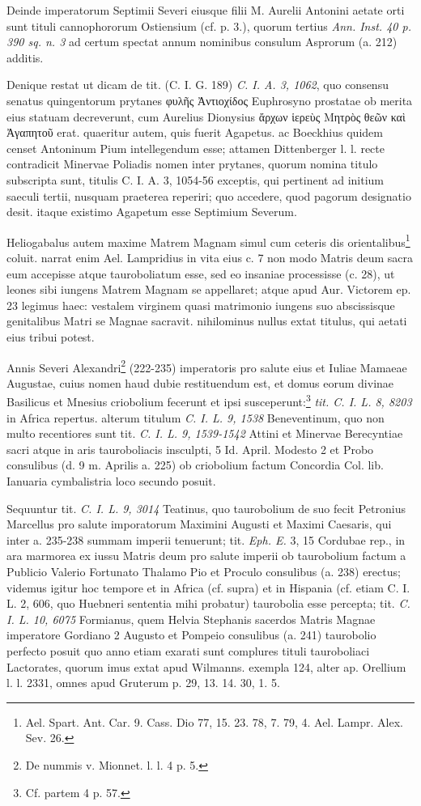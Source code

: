 \documentclass[a4paper, 11pt, oneside, polutonikogreek, german]{article}
\begin{document}
Deinde imperatorum Septimii Severi eiusque filii M. Aurelii Antonini aetate orti sunt tituli cannophororum Ostiensium (cf. p. 3.), quorum tertius \emph{Ann. Inst. 40 p. 390 sq. n. 3} ad certum spectat annum nominibus consulum Asprorum (a. 212) additis.

Denique restat ut dicam de tit. (C. I. G. 189) \emph{C. I. A. 3, 1062}, quo consensu senatus quingentorum prytanes φυλῆς Ἀντιοχίδος Euphrosyno prostatae ob merita eius statuam decreverunt, cum Aurelius Dionysius ἄρχων ἱερεὺς Μητρὸς θεῶν καὶ Ἀγαπητοῦ erat. quaeritur autem, quis fuerit Agapetus. ac Boeckhius quidem censet Antoninum Pium intellegendum esse; attamen Dittenberger l. l. recte contradicit Minervae Poliadis nomen inter prytanes, quorum nomina titulo subscripta sunt, titulis C. I. A. 3, 1054-56 exceptis, qui pertinent ad initium saeculi tertii, nusquam praeterea reperiri; quo accedere, quod pagorum designatio desit. itaque existimo Agapetum esse Septimium Severum.

Heliogabalus autem maxime Matrem Magnam simul cum ceteris dis orientalibus\footnote{Ael. Spart. Ant. Car. 9. Cass. Dio 77, 15. 23. 78, 7. 79, 4. Ael. Lampr. Alex. Sev. 26.} coluit. narrat enim Ael. Lampridius in vita eius c. 7 non modo Matris deum sacra eum accepisse atque tauroboliatum esse, sed eo insaniae processisse (c. 28), ut leones sibi iungens Matrem Magnam se appellaret; atque apud Aur. Victorem ep. 23 legimus haec: vestalem virginem quasi matrimonio iungens suo abscissisque genitalibus Matri se Magnae sacravit. nihilominus nullus extat titulus, qui aetati eius tribui potest.

Annis Severi Alexandri\footnote{De nummis v. Mionnet. l. l. 4 p. 5.} (222-235) imperatoris pro salute eius et Iuliae Mamaeae Augustae, cuius nomen haud dubie restituendum est, et domus eorum divinae Basilicus et Mnesius criobolium fecerunt et ipsi susceperunt:\footnote{Cf. partem 4 p. 57.} \emph{tit. C. I. L. 8, 8203} in Africa repertus. alterum titulum \emph{C. I. L. 9, 1538} Beneventinum, quo non multo recentiores sunt tit. \emph{C. I. L. 9, 1539-1542} Attini et Minervae Berecyntiae sacri atque in aris tauroboliacis insculpti, 5 Id. April. Modesto 2 et Probo consulibus (d. 9 m. Aprilis a. 225) ob criobolium factum Concordia Col. lib. Ianuaria cymbalistria loco secundo posuit.

Sequuntur tit. \emph{C. I. L. 9, 3014} Teatinus, quo taurobolium de suo fecit Petronius Marcellus pro salute imporatorum Maximini Augusti et Maximi Caesaris, qui inter a. 235-238 summam imperii tenuerunt; tit. \emph{Eph. E.} 3, 15 Cordubae rep., in ara marmorea ex iussu Matris deum pro salute imperii ob taurobolium factum a Publicio Valerio Fortunato Thalamo Pio et Proculo consulibus (a. 238) erectus; videmus igitur hoc tempore et in Africa (cf. supra) et in Hispania (cf. etiam C. I. L. 2, 606, quo Huebneri sententia mihi probatur) taurobolia esse percepta; tit. \emph{C. I. L. 10, 6075} Formianus, quem Helvia Stephanis sacerdos Matris Magnae imperatore Gordiano 2 Augusto et Pompeio consulibus (a. 241) taurobolio perfecto posuit quo anno etiam exarati sunt complures tituli tauroboliaci Lactorates, quorum imus extat apud Wilmanns. exempla 124, alter ap. Orellium l. l. 2331, omnes apud Gruterum p. 29, 13. 14. 30, 1. 5.
\end{document}
